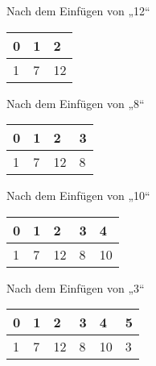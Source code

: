\documentclass{bschlangaul-aufgabe}
\begin{document}
\begin{enumerate}
\begin{enumerate}
\begin{bBaum}{Nach dem Einfügen von „12“}
\begin{tabular}{lll}
\bf{0} & \bf{1} & \bf{2} \\
\hline
1      & 7      & 12     \\
\end{tabular}

\end{bBaum}

\begin{bBaum}{Nach dem Einfügen von „8“}
\begin{tabular}{llll}
\bf{0} & \bf{1} & \bf{2} & \bf{3} \\
\hline
1      & 7      & 12     & 8      \\
\end{tabular}

\end{bBaum}

\begin{bBaum}{Nach dem Einfügen von „10“}
\begin{tabular}{lllll}
\bf{0} & \bf{1} & \bf{2} & \bf{3} & \bf{4} \\
\hline
1      & 7      & 12     & 8      & 10     \\
\end{tabular}

\end{bBaum}

\begin{bBaum}{Nach dem Einfügen von „3“}
\begin{tabular}{llllll}
\bf{0} & \bf{1} & \bf{2} & \bf{3} & \bf{4} & \bf{5} \\
\hline
1      & 7      & 12     & 8      & 10     & 3      \\
\end{tabular}

\end{bBaum}


\end{enumerate}
\end{enumerate}
\end{document}
